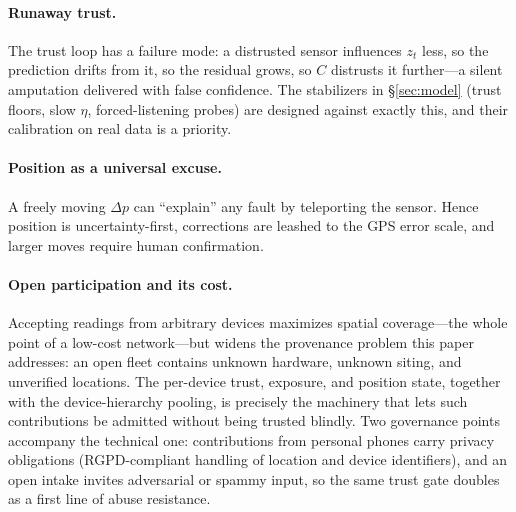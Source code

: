\documentclass[10pt]{article}
\begin{document}
\paragraph{Runaway trust.}
The trust loop has a failure mode: a distrusted sensor influences $z_t$ less, so
the prediction drifts from it, so the residual grows, so $C$ distrusts it
further---a silent amputation delivered with false confidence. The stabilizers in
\S\ref{sec:model} (trust floors, slow $\eta$, forced-listening probes) are
designed against exactly this, and their calibration on real data is a priority.

\paragraph{Position as a universal excuse.}
A freely moving $\Delta p$ can ``explain'' any fault by teleporting the sensor.
Hence position is uncertainty-first, corrections are leashed to the GPS error
scale, and larger moves require human confirmation.

\paragraph{Open participation and its cost.}
Accepting readings from arbitrary devices maximizes spatial coverage---the whole
point of a low-cost network---but widens the provenance problem this paper
addresses: an open fleet contains unknown hardware, unknown siting, and unverified
locations. The per-device trust, exposure, and position state, together with the
device-hierarchy pooling, is precisely the machinery that lets such contributions
be admitted without being trusted blindly. Two governance points accompany the
technical one: contributions from personal phones carry privacy obligations
(RGPD-compliant handling of location and device identifiers), and an open intake
invites adversarial or spammy input, so the same trust gate doubles as a first line
of abuse resistance.
\end{document}
